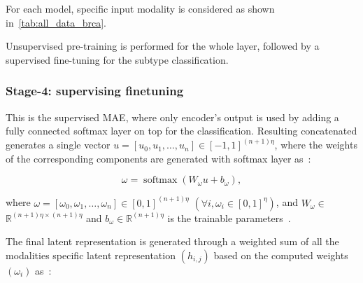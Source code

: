 \hspace*{3.5mm} For each model, specific input modality is considered as shown in~\cref{tab:all_data_brca}. 



Unsupervised pre-training is performed for the whole layer, followed by a supervised fine-tuning for the subtype classification. 

\subsubsection{Stage-4: supervising finetuning}
This is the supervised MAE, where only encoder's output is used by adding a fully connected softmax layer on top for the classification. 
\hspace*{3.5mm} Resulting concatenated generates a single vector $u=\left[u_{0}, u_{1}, \ldots, u_{n}\right] \in[-1,1]^{(n+1) \eta}$, where the weights of the corresponding components are generated with  softmax layer as~\cite{mmdcae}:

\begin{equation}
    \omega=\operatorname{softmax}\left(W_{\omega} u+b_{\omega}\right),
\end{equation}

\hspace*{3.5mm} where $\omega=\left[\omega_{0}, \omega_{1}, \ldots, \omega_{n}\right] \in[0,1]^{(n+1) \eta}$ $\left(\forall i, \omega_{i} \in[0,1]^{\eta}\right)$, and  $W_{\omega} \in$ $\mathbb{R}^{(n+1) \eta \times(n+1) \eta}$ and $b_{\omega} \in \mathbb{R}^{(n+1) \eta}$ is the trainable parameters~\cite{mmdcae}. 

The final latent representation is generated through a weighted sum of all the modalities specific latent representation $\left(h_{i,j}\right)$ based on the computed weights $\left(\omega_{i}\right)$ as~\cite{mmdcae}: 

